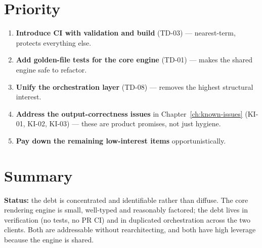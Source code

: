 \section{Priority}

\begin{enumerate}
  \item \textbf{Introduce CI with validation and build} (TD-03) --- nearest-term,
        protects everything else.
  \item \textbf{Add golden-file tests for the core engine} (TD-01) --- makes the
        shared engine safe to refactor.
  \item \textbf{Unify the orchestration layer} (TD-08) --- removes the highest
        structural interest.
  \item \textbf{Address the output-correctness issues} in
        Chapter~\ref{ch:known-issues} (KI-01, KI-02, KI-03) --- these are product
        promises, not just hygiene.
  \item \textbf{Pay down the remaining low-interest items} opportunistically.
\end{enumerate}

\section{Summary}

\textbf{Status:} the debt is concentrated and identifiable rather than diffuse.
The core rendering engine is small, well-typed and reasonably factored; the debt
lives in verification (no tests, no PR CI) and in duplicated orchestration across
the two clients. Both are addressable without rearchitecting, and both have high
leverage because the engine is shared.
